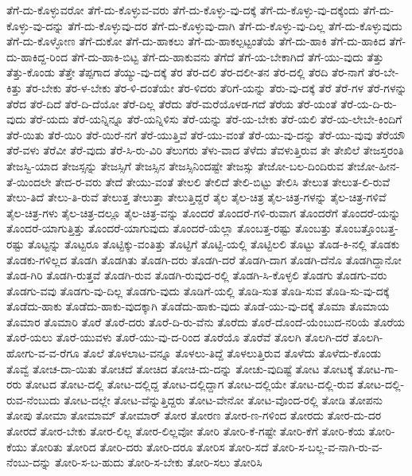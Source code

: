 ತೆಗೆ-ದು-ಕೊಳ್ಳುವರೋ
ತೆಗೆ-ದು-ಕೊಳ್ಳುವ-ವರು
ತೆಗೆ-ದು-ಕೊಳ್ಳು-ವು-ದಕ್ಕೆ
ತೆಗೆ-ದು-ಕೊಳ್ಳು-ವು-ದಕ್ಕೆಂದು
ತೆಗೆ-ದು-ಕೊಳ್ಳು-ವು-ದನ್ನು
ತೆಗೆ-ದು-ಕೊಳ್ಳುವು-ದರ
ತೆಗೆ-ದು-ಕೊಳ್ಳುವು-ದಾಗಿ
ತೆಗೆ-ದು-ಕೊಳ್ಳು-ವು-ದಿಲ್ಲ
ತೆಗೆ-ದು-ಕೊಳ್ಳುವುದು
ತೆಗೆ-ದು-ಕೊಳ್ಳೋಣ
ತೆಗೆ-ದುಕೋ
ತೆಗೆ-ದು-ಹಾಕಲು
ತೆಗೆ-ದು-ಹಾಕಲ್ಪಟ್ಟಂತೆಯೆ
ತೆಗೆ-ದು-ಹಾಕಿ
ತೆಗೆ-ದು-ಹಾಕಿದ
ತೆಗೆ-ದು-ಹಾಕಿದ್ದ-ರಿಂದ
ತೆಗೆ-ದು-ಹಾಕಿ-ಬಿಟ್ಟ
ತೆಗೆ-ದು-ಹಾಕುವನು
ತೆಗೆದೆ
ತೆಗೆ-ಯ-ಬೇಕಾಗಿದೆ
ತೆಗೆ-ಯು-ವುದು
ತೆತ್ತು
ತೆತ್ತು-ಕೊಂಡು
ತೆತ್ತೇ
ತೆಪ್ಪಗಾದ
ತೆಯ್ಯು-ವು-ದಕ್ಕೆ
ತೆರ
ತೆರ-ದಲಿ
ತೆರ-ದಲೀ-ತನ
ತೆರ-ದಲ್ಲಿ
ತೆರದಿ
ತೆರ-ನಾಗೆ
ತೆರ-ಬೇ-ಕಿತ್ತು
ತೆರ-ಬೇಕು
ತೆರ-ಳ-ಬೇಕು
ತೆರ-ಳಿ-ದಂತೆಯೇ
ತೆರ-ಳಿದರು
ತೆರಿಗೆ-ಯನ್ನು
ತೆರು-ವು-ದಕ್ಕೆ
ತೆರೆ
ತೆರೆ-ಗಳ
ತೆರೆ-ಗಳನ್ನು
ತೆರೆದ
ತೆರೆ-ದಿದೆ
ತೆರೆ-ದಿ-ದೆಯೋ
ತೆರೆ-ದಿಲ್ಲ
ತೆರೆದು
ತೆರೆ-ಮರೆಯೊಳಡ-ಗದೆ
ತೆರೆಯ
ತೆರೆ-ಯಂತೆ
ತೆರೆ-ಯ-ದಿ-ರು-ವುದು
ತೆರೆ-ಯದು
ತೆರೆ-ಯನ್ನಿನ್ನೂ
ತೆರೆ-ಯನ್ನಿಳಿಸು
ತೆರೆ-ಯನ್ನು
ತೆರೆ-ಯ-ಬೇಕು
ತೆರೆ-ಯಲಿ
ತೆರೆ-ಯ-ಲೇಬೇ-ಕಿಂದಿಗೆ
ತೆರೆ-ಯಿತು
ತೆರೆ-ಯಿರಿ
ತೆರೆ-ಯಿರೆ-ನಗೆ
ತೆರೆ-ಯುತ್ತಿವೆ
ತೆರೆ-ಯು-ವಂತೆ
ತೆರೆ-ಯು-ವು-ದನ್ನು
ತೆರೆ-ಯು-ವುವು
ತೆರೆಯೌ
ತೆರೆ-ವಳು
ತೆರೆವೀ
ತೆರೆ-ವುದು
ತೆರೆ-ಸಿ-ರು-ವಿರಿ
ತೆಲುಗರು
ತೆಳು-ವಾದ
ತೆಳೆದು
ತೆವಳುತ್ತಿರುವ
ತೇ
ತೇಖಿಲೆ
ತೇಜಸ್ತರಂತಿ
ತೇಜಸ್ವಿ-ಯಾದ
ತೇಜಸ್ಸನ್ನು
ತೇಜಸ್ಸಿಗೆ
ತೇಜಸ್ಸಿನ
ತೇಜಸ್ಸಿನಿಂದಷ್ಟೇ
ತೇಜಸ್ಸು
ತೇಜೋ-ಬಲ-ದಿಂದಿರುವ
ತೇಜೋ-ಹೀನ-ತೆ-ಯಿಂದಲೇ
ತೇದ-ರ-ವರು
ತೇದೆ
ತೇಯು-ವಂತೆ
ತೇಲಲಿ
ತೇಲಿದೆ
ತೇಲಿ-ಬಿಟ್ಟು
ತೇಲಿಸಿ
ತೇಲುತ
ತೇಲುತ-ಲಿ-ರುವೆ
ತೇಲು-ತಿದೆ
ತೇಲು-ತಿ-ರುವೆ
ತೇಲುತ್ತ
ತೇಲುತ್ತಾ
ತೇಲುತ್ತಿದ್ದರೆ
ತೈಲ
ತೈಲ-ಚಿತ್ರ
ತೈಲ-ಚಿತ್ರ-ಗಳನ್ನು
ತೈಲ-ಚಿತ್ರ-ಗಳಿವೆ
ತೈಲ-ಚಿತ್ರ-ಗಳು
ತೈಲ-ಚಿತ್ರ-ದಲ್ಲೂ
ತೈಲ-ಚಿತ್ರ-ವನ್ನು
ತೊಂದರೆ
ತೊಂದರೆ-ಗಳಿ-ರುವಾಗ
ತೊಂದರೆಗೆ
ತೊಂದರೆ-ಯನ್ನು
ತೊಂದರೆ-ಯಾಗುತ್ತಿತ್ತು
ತೊಂದರೆ-ಯಾಗುವುದು
ತೊಂದರೆ-ಯೆಲ್ಲಾ
ತೊಂಬತ್ತ-ರಷ್ಟು
ತೊಂಬತ್ತು
ತೊಂಬತ್ತೊಂಬತ್ತ-ರಷ್ಟು
ತೊಟ್ಟನ್ನು
ತೊಟ್ಟರೂ
ತೊಟ್ಟಿಕ್ಕು-ವಂತಿತ್ತು
ತೊಟ್ಟಿಗೆ
ತೊಟ್ಟಿ-ಯಲ್ಲಿ
ತೊಟ್ಟಿಲಲಿ
ತೊಟ್ಟು
ತೊಡ-ಕಿ-ನಲ್ಲಿ
ತೊಡಕು
ತೊಡಕು-ಗಳಿಲ್ಲದ
ತೊಡಗಿ
ತೊಡಗಿತು
ತೊಡಗಿ-ದರು
ತೊಡಗಿ-ದರೆ
ತೊಡಗಿ-ದಾಗ
ತೊಡಗಿ-ದೆನೊ
ತೊಡಗಿದ್ದಾನೋ
ತೊಡ-ಗಿರಿ
ತೊಡಗಿ-ರುತ್ತವೆ
ತೊಡಗಿ-ರುವ
ತೊಡಗಿ-ರುವುದ-ರಲ್ಲಿ
ತೊಡಗಿ-ಸಿ-ಕೊಳ್ಳಲಿ
ತೊಡಗು
ತೊಡಗು-ವರು
ತೊಡಗು-ವವು
ತೊಡಗು-ವು-ದಿಲ್ಲ
ತೊಡಗು-ವುದು
ತೊಡಿಗೆ-ಯಲ್ಲಿ
ತೊಡಿ-ಸುತ
ತೊಡಿ-ಸುವ
ತೊಡಿ-ಸು-ವು-ದಕ್ಕೆ
ತೊಡೆದು-ಹಾಕು
ತೊಡೆದು-ಹಾಕು-ವುದಕ್ಕಾಗಿ
ತೊಡೆದು-ಹಾಕು-ವುದು
ತೊಡೆ-ಯು-ವು-ದಕ್ಕೆ
ತೊಮಾ
ತೊಮಾಯ
ತೊಮಾರ
ತೊಮಾರಿ
ತೊರೆ
ತೊರೆ-ದರು
ತೊರೆ-ದಿ-ರು-ವೆನು
ತೊರೆದು
ತೊರೆ-ದೊಂದೆ-ಯೆಂಬುದ-ನರಿಯೆ
ತೊರೆಯ
ತೊರೆ-ಯಲು
ತೊರೆ-ಯುವಳು
ತೊರೆ-ಯು-ವು-ದ-ರಿಂದ
ತೊರೆಯೊ
ತೊರೆವೆ
ತೊಲಗಿ
ತೊಲಗಿ-ದರೆ
ತೊಲಗಿ-ಹೋಗು-ವ-ವ-ರೆಗೂ
ತೊಲೆ
ತೊಳಲಾಟ-ವನ್ನೂ
ತೊಳಲು-ತಿದ್ದೆ
ತೊಳಲುತ್ತಿರುವ
ತೊಳೆದು
ತೊಳೆದು-ಕೊಂಡು
ತೊವ್ವೆ
ತೋಚ-ದಾ-ಯಿತು
ತೋಚದೆ
ತೋಚಿದ
ತೋಚಿ-ದು-ದನ್ನು
ತೋಚು-ವುದಿಷ್ಟೆ
ತೋಟ
ತೋಟಕ್ಕೆ
ತೋಟ-ಗಾ-ರರು
ತೋಟದ
ತೋಟ-ದಲ್ಲಿ
ತೋಟ-ದಲ್ಲಿದ್ದ
ತೋಟ-ದಲ್ಲಿದ್ದಾಗ
ತೋಟ-ದಲ್ಲಿಯೇ
ತೋಟ-ದಲ್ಲಿ-ರುವ
ತೋಟ-ದಲ್ಲಿ-ರುವ-ನೆಂಬುದು
ತೋಟ-ದಲ್ಲೇ
ತೋಟ-ವೆನ್ನುತ್ತಿದ್ದರು
ತೋಟ-ವೇನೋ
ತೋಟ-ವೊಂದ-ರಲ್ಲಿ
ತೋಡಿ
ತೋಪನು
ತೋಪು
ತೋಮಾ
ತೋಮಾಮ್
ತೋಮಾರ್
ತೋರ
ತೋರಣ
ತೋರ-ಣ-ಗಳಿಂದ
ತೋರದು
ತೋರ-ದು-ದರ
ತೋರದೆ
ತೋರ-ಬೇಕು
ತೋರ-ಲಿಲ್ಲ
ತೋರ-ಲಿಲ್ಲವೋ
ತೋರಿ
ತೋರಿ-ಕೆ-ಗಷ್ಟೇ
ತೋರಿ-ಕೆಗೆ
ತೋರಿ-ಕೆಯ
ತೋರಿ-ಕೆಯು
ತೋರಿತು
ತೋರಿದ
ತೋರಿ-ದರು
ತೋರಿ-ದರೂ
ತೋರಿಸ
ತೋರಿ-ಸದೆ
ತೋರಿ-ಸ-ಬಲ್ಲ-ವ-ನಾಗಿ-ರು-ವ-ನೆಂಬು-ದನ್ನು
ತೋರಿ-ಸ-ಬ-ಹುದು
ತೋರಿ-ಸ-ಬೇಕು
ತೋರಿ-ಸಲು
ತೋರಿಸಿ
